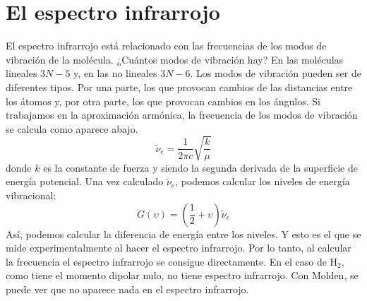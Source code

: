 \documentclass{tufte-book}
\begin{document}
\section{El espectro infrarrojo}
El espectro infrarrojo está relacionado con las frecuencias
de los modos de vibración de la molécula. ¿Cuántos modos de
vibración hay? En las moléculas lineales $3N-5$ y, en las 
no lineales $3N-6$. Los modos de vibración pueden ser de
diferentes tipos. Por una parte, los que provocan cambios 
de las distancias entre los átomos y, por otra parte, los
que provocan cambios en los ángulos. Si trabajamos en la
aproximación armónica, la frecuencia de los modos de
vibración se calcula como aparece abajo. 
\begin{equation}
    \tilde{\nu}_e = \frac{1}{2\pi c}\sqrt{\frac{k}{\mu}}
\end{equation}
donde $k$ es la constante de fuerza y siendo la segunda derivada
de la superficie de energía potencial. Una vez calculado 
$\tilde{\nu}_e$, podemos calcular los niveles de energía 
vibracional:
\begin{equation}
    G(\upsilon) = \left(\frac{1}{2}+\upsilon\right)\tilde{\nu}_e
\end{equation}
Así, podemos calcular la diferencia de energía entre
los niveles.
Y esto es el que se mide experimentalmente al hacer el espectro
infrarrojo. Por lo tanto, al calcular la frecuencia el espectro
infrarrojo se consigue directamente. En el caso de H$_2$, como
tiene el momento dipolar nulo, no tiene espectro infrarrojo. 
Con Molden, se puede ver que no aparece nada en el espectro
infrarrojo.
\end{document}
